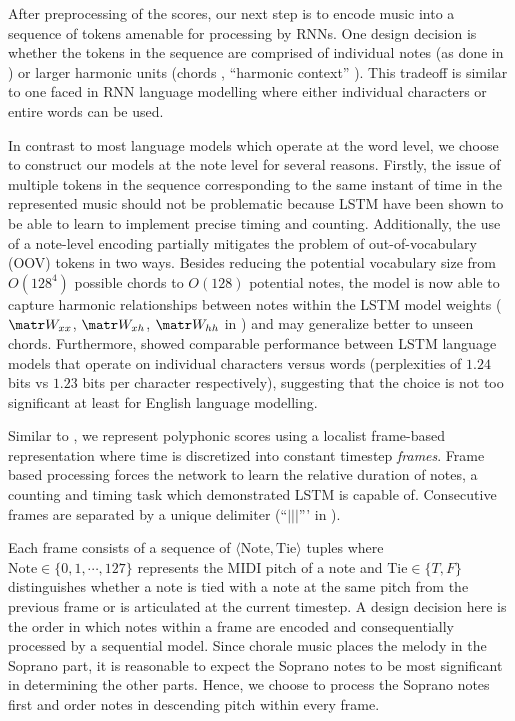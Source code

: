 After preprocessing of the scores, our next step is to encode music into a
sequence of tokens amenable for processing by RNNs. One design decision is
whether the tokens in the sequence are comprised of individual notes (as done
in \citep{mozer1994neural,franklin2004recurrent,sturm2016music}) or larger
harmonic units (\eg chords \citep{Eck2002,Boulanger-Lewandowski2012},
``harmonic context'' \citep{Allan2005}). This tradeoff is similar to one faced
in RNN language modelling where either individual characters or entire words
can be used.

In contrast to most language models which operate at the word level, we choose
to construct our models at the note level for several reasons.
Firstly, the issue of multiple tokens in the sequence corresponding to the same
instant of time in the represented music should not be problematic because
LSTM have been shown to be able to learn to implement precise timing and
counting\cite{gers2002learning}. Additionally, the use of a note-level encoding
partially mitigates the problem of out-of-vocabulary (OOV) tokens in two ways.
Besides reducing the potential vocabulary size from $O(128^4)$ possible chords
to $O(128)$ potential notes, the model is now able to capture harmonic
relationships between notes within the LSTM model weights ($\W_{xx}$,
$\W_{xh}$, $\W_{hh}$ in ) and may generalize better to unseen
chords. Furthermore, \citet{graves2013generating} showed comparable performance
between LSTM language models that operate on individual characters versus words
(perplexities of $1.24$ bits vs $1.23$ bits per character respectively),
suggesting that the choice is not too significant at least for English language
modelling.

Similar to \citep{todd1989connectionist}, we represent polyphonic scores using
a localist frame-based representation where time is discretized into constant
timestep \emph{frames}. Frame based processing forces the network to learn the
relative duration of notes, a counting and timing task which
\citep{gers2002learning} demonstrated LSTM is capable of. Consecutive frames are
separated by a unique delimiter (``$|||$''' in ).


Each frame consists of a sequence of $\langle \text{Note}, \text{Tie} \rangle$
tuples where $\text{Note} \in \{0,1,\cdots,127\}$ represents the MIDI pitch of
a note and $\text{Tie} \in \{T,F\}$ distinguishes whether a note is tied with a
note at the same pitch from the previous frame or is articulated at the current
timestep. A design decision here is the order in which notes within a frame are
encoded and consequentially processed by a sequential model. Since chorale
music places the melody in the Soprano part, it is reasonable to expect the
Soprano notes to be most significant in determining the other parts. Hence, we
choose to process the Soprano notes first and order notes in descending pitch
within every frame.

